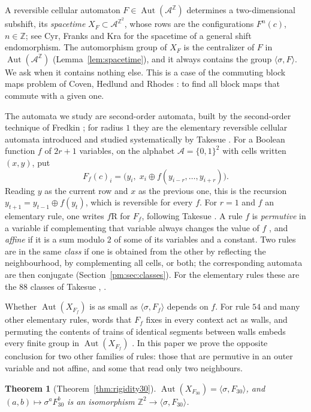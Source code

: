 \documentclass[11pt]{amsart}
\newtheorem{theorem}{Theorem}[section]
\theoremstyle{definition}
\theoremstyle{remark}
\newcommand{\Z}{\mathbb{Z}}
\newcommand{\A}{\mathcal{A}}
\newcommand{\Aut}{\operatorname{Aut}}
\newcommand{\sh}{\sigma}
\begin{document}
A reversible cellular automaton $F\in\Aut(\A^{\Z})$ determines a two-dimensional subshift, its \emph{spacetime} $X_F\subset\A^{\Z^2}$, whose rows are the configurations $F^n(c)$, $n\in\Z$; see Cyr, Franks and Kra \cite{CFK2019} for the spacetime of a general shift endomorphism. The automorphism group of $X_F$ is the centralizer of $F$ in $\Aut(\A^{\Z})$ (Lemma~\ref{lem:spacetime}), and it always contains the group $\langle\sh,F\rangle$. We ask when it contains nothing else. This is a case of the commuting block maps problem of Coven, Hedlund and Rhodes \cite{CHR1979}: to find all block maps that commute with a given one.

The automata we study are second-order automata, built by the second-order technique of Fredkin \cite{TM1990,Wolfram2002}; for radius $1$ they are the elementary reversible cellular automata introduced and studied systematically by Takesue \cite{Takesue1987,Takesue1989}. For a Boolean function $f$ of $2r+1$ variables, on the alphabet $\A=\{0,1\}^2$ with cells written $(x,y)$, put
\[
F_f(c)_i=\bigl(y_i,\;x_i\oplus f(y_{i-r},\dots,y_{i+r})\bigr).
\]
Reading $y$ as the current row and $x$ as the previous one, this is the recursion $y_{t+1}=y_{t-1}\oplus f(y_t)$, which is reversible for every $f$. For $r=1$ and $f$ an elementary rule, one writes $f$R for $F_f$, following Takesue \cite{Takesue1987}. A rule $f$ is \emph{permutive} in a variable if complementing that variable always changes the value of $f$ \cite{Hedlund1969}, and \emph{affine} if it is a sum modulo $2$ of some of its variables and a constant. Two rules are in the same \emph{class} if one is obtained from the other by reflecting the neighbourhood, by complementing all cells, or both; the corresponding automata are then conjugate (Section~\ref{pm:sec:classes}). For the elementary rules these are the $88$ classes of Takesue \cite{Takesue1987}, \cite[Table~I]{Takesue1989}.

Whether $\Aut(X_{F_f})$ is as small as $\langle\sh,F_f\rangle$ depends on $f$. For rule $54$ and many other elementary rules, words that $F_f$ fixes in every context act as walls, and permuting the contents of trains of identical segments between walls embeds every finite group in $\Aut(X_{F_f})$ \cite{PaperC}. In this paper we prove the opposite conclusion for two other families of rules: those that are permutive in an outer variable and not affine, and some that read only two neighbours.

\begin{theorem}[Theorem~\ref{thm:rigidity30}]\label{intro:thm:30}
$\Aut(X_{F_{30}})=\langle\sh,F_{30}\rangle$, and $(a,b)\mapsto\sh^aF_{30}^b$ is an isomorphism $\Z^2\to\langle\sh,F_{30}\rangle$.
\end{theorem}
\end{document}
